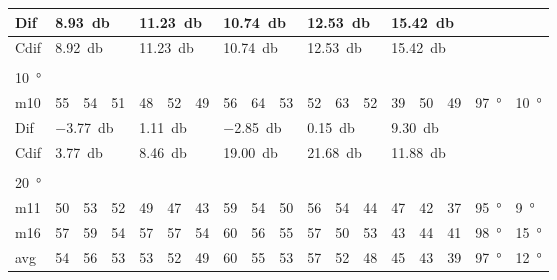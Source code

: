 \begin{table}[H]
\begin{tabular}{l|l|l|l|l|l|l|l|l|l|l|l|l|l|l|l|l|l}
Dif & \multicolumn{3}{l|}{\SI{8.93}{\decibel}} & \multicolumn{3}{l|}{\SI{11.23}{\decibel}} & \multicolumn{3}{l|}{\SI{10.74}{\decibel}} & \multicolumn{3}{l|}{\SI{12.53}{\decibel}} & \multicolumn{3}{l|}{\SI{15.42}{\decibel}} & \multicolumn{2}{l}{}  \\ \hline 
Cdif & \multicolumn{3}{l|}{\SI{8.92}{\decibel}} & \multicolumn{3}{l|}{\SI{11.23}{\decibel}} & \multicolumn{3}{l|}{\SI{10.74}{\decibel}} & \multicolumn{3}{l|}{\SI{12.53}{\decibel}} & \multicolumn{3}{l|}{\SI{15.42}{\decibel}}  &   \multicolumn{2}{l}{}   \\ 
 \multicolumn{18}{l}{ } \\                             
\SI{10}{\degree}   & \multicolumn{3}{l|}{} & \multicolumn{3}{l|}{} & \multicolumn{3}{l|}{} & \multicolumn{3}{l|}{} &  \multicolumn{3}{l|}{}  & \multicolumn{2}{l}{}    \\  \hline
m10   &  55    &  54    &  51    & 48     &  52    &  49    & 56     &  64     &  53    &  52     &  63    &  52    & 39 & 50 & 49   & \SI{97}{\degree} & \SI{10}{\degree}  \\ \hline
Dif & \multicolumn{3}{l|}{\SI{-3.77}{\decibel}} & \multicolumn{3}{l|}{\SI{1.11}{\decibel}} & \multicolumn{3}{l|}{\SI{-2.85}{\decibel}} & \multicolumn{3}{l|}{\SI{0.15}{\decibel}} &  \multicolumn{3}{l|}{\SI{9.30}{\decibel}}  & \multicolumn{2}{l}{}   \\ \hline 
Cdif & \multicolumn{3}{l|}{\SI{3.77}{\decibel}} & \multicolumn{3}{l|}{\SI{8.46}{\decibel}} & \multicolumn{3}{l|}{\SI{19.00}{\decibel}} & \multicolumn{3}{l|}{\SI{21.68}{\decibel}} & \multicolumn{3}{l|}{\SI{11.88}{\decibel}}  &   \multicolumn{2}{l}{}   \\ 
 \multicolumn{18}{l}{ } \\                             
\SI{20}{\degree}   & \multicolumn{3}{l|}{} & \multicolumn{3}{l|}{} & \multicolumn{3}{l|}{} & \multicolumn{3}{l|}{} &  \multicolumn{3}{l|}{}   & \multicolumn{2}{l}{}   \\  \hline
m11    & 50     &  53    &  52    &  49    & 47     &  43    &  59    &  54     &  50    &   56    &  54    &   44   & 47 & 42 & 37  & \SI{95}{\degree} & \SI{9}{\degree}   \\
m16    & 57     & 59     &  54    &  57    & 57     & 54     &   60   &  56     &  55    &  57     &  50    &  53    & 43 & 44 & 41   & \SI{98}{\degree} & \SI{15}{\degree}  \\ \hline
avg &  54    &  56    &  53    &   53   &  52    &  49    &  60    &   55    &  53    &   57    &  52    &  48    & 45 & 43  &39    & \SI{97}{\degree} & \SI{12}{\degree}  \\ \hline  

\end{tabular}
\end{table}
